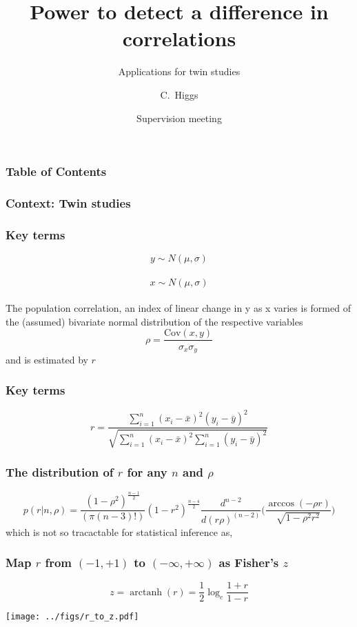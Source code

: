 \documentclass{beamer}
\title{Power to detect a difference in correlations}
\subtitle{Applications for twin studies}
\author{C.~Higgs\inst{1}}
\institute[Affiliation] %
{
  \inst{1}%
  Centre for Epidemiology and Biostatistics\\
  School of Population and Global Health\\
  University of Melbourne
}
\date[March 2018] %
{Supervision meeting}
\DeclareMathOperator\arctanh{arctanh}
\newcommand{\Cov}{\mathrm{Cov}}
\begin{document}
  \frame{\titlepage}
  
  \begin{frame}
    \frametitle{Table of Contents}
    \tableofcontents[currentsection]
  \end{frame}

  \begin{frame}
    \frametitle{Context: Twin studies}
  \end{frame}
  
  \begin{frame}
    \frametitle{Key terms}
    \[y \sim N(\mu,\sigma)\] \\
    \[x \sim N(\mu,\sigma)\] \\
    The population correlation, an index of linear change in y as x varies is formed of the (assumed) bivariate normal distribution of the respective variables  \\
    \[\rho = \frac{\Cov(x,y)}{\sigma_x \sigma_y} \]
    and is estimated by \(r\)
  \end{frame}  
  
  \begin{frame}
    \frametitle{Key terms}
    \[r = \frac{\sum_{i=1}^{n} (x_i - \bar{x})^2(y_i - \bar{y})^2}{\sqrt{\sum_{i=1}^{n} (x_i - \bar{x})^2 \sum_{i=1}^{n} (y_i - \bar{y})^2}}\]
  \end{frame}
  
  \begin{frame}
    \frametitle{The distribution of \(r\) for any \(n\) and \(\rho\)  } 
    \[p(r | n, \rho) = \frac{(1-\rho^2)^{\frac{n-1}{2}}}{(\pi (n-3)!)} (1-r^2)^\frac{n-4}{2}\frac{d^{n-2}}{d(r\rho)^(n-2)}\bigg(\frac{\arccos(-\rho r)}{ \sqrt{1-\rho^2 r^2}}\bigg)\] 
  which is not so tracactable for statistical inference as,
  
  \end{frame}
  
  \begin{frame}
    \frametitle{Map \(r\) from \((-1,+1)\) to \((-\infty,+\infty)\) as Fisher's \(z\) }
    \[z     = \arctanh(r) = \frac{1}{2} \log_e \frac{1+r}{1-r} \]
    \begin{center}
      \texttt{[image: ../figs/r\_to\_z.pdf]}
    \end{center}
  \end{frame}
\end{document}
